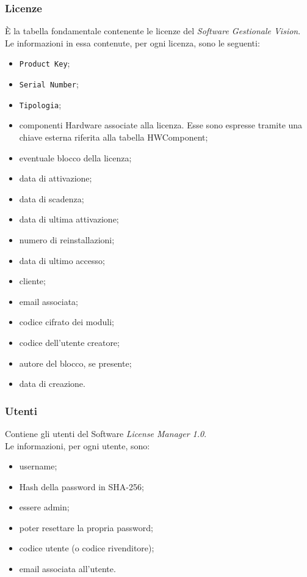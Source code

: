 \subsubsection{Licenze}
È la tabella fondamentale contenente le licenze del \textit{Software Gestionale Vision}. \\Le informazioni in essa contenute, per ogni licenza, sono le seguenti:

\begin{itemize}
\item \texttt{Product Key};
\item \texttt{Serial Number};
\item \texttt{Tipologia};
\item componenti Hardware associate alla licenza. Esse sono espresse tramite una chiave esterna riferita alla tabella HWComponent;
\item eventuale blocco della licenza;
\item data di attivazione;
\item data di scadenza;
\item data di ultima attivazione;
\item numero di reinstallazioni;
\item data di ultimo accesso;
\item cliente;
\item email associata;
\item codice cifrato dei moduli;
\item codice dell'utente creatore;
\item autore del blocco, se presente;
\item data di creazione.
\end{itemize}

\subsubsection{Utenti}

Contiene gli utenti del Software \textit{License Manager 1.0}.\\ Le informazioni, per ogni utente, sono:

\begin{itemize}
\item username;
\item \gls{Hash} della password in \gls{SHA-256};
\item essere admin;
\item poter resettare la propria password;
\item codice utente (o codice rivenditore);
\item email associata all'utente.
\end{itemize} 

